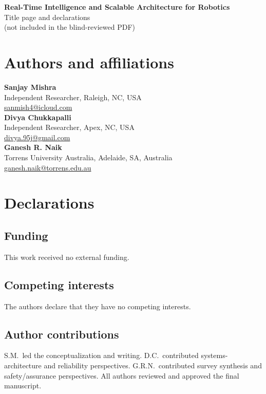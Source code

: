 \documentclass[11pt]{article}
\begin{document}
\begin{center}
  {\LARGE\bfseries Real-Time Intelligence and Scalable Architecture for Robotics}\\[1.5em]
  {\large Title page and declarations}\\[0.5em]
  {\normalsize (not included in the blind-reviewed PDF)}\\[2em]
\end{center}

\section*{Authors and affiliations}
\textbf{Sanjay Mishra}\\
Independent Researcher, Raleigh, NC, USA\\
\href{mailto:sanmish4@icloud.com}{sanmish4@icloud.com}\\[0.8em]
\textbf{Divya Chukkapalli}\\
Independent Researcher, Apex, NC, USA\\
\href{mailto:divya.95j@gmail.com}{divya.95j@gmail.com}\\[0.8em]
\textbf{Ganesh R. Naik}\\
Torrens University Australia, Adelaide, SA, Australia\\
\href{mailto:ganesh.naik@torrens.edu.au}{ganesh.naik@torrens.edu.au}

\section*{Declarations}

\subsection*{Funding}
This work received no external funding.

\subsection*{Competing interests}
The authors declare that they have no competing interests.

\subsection*{Author contributions}
S.M.\ led the conceptualization and writing.
D.C.\ contributed systems-architecture and reliability perspectives.
G.R.N.\ contributed survey synthesis and safety/assurance perspectives.
All authors reviewed and approved the final manuscript.
\end{document}

